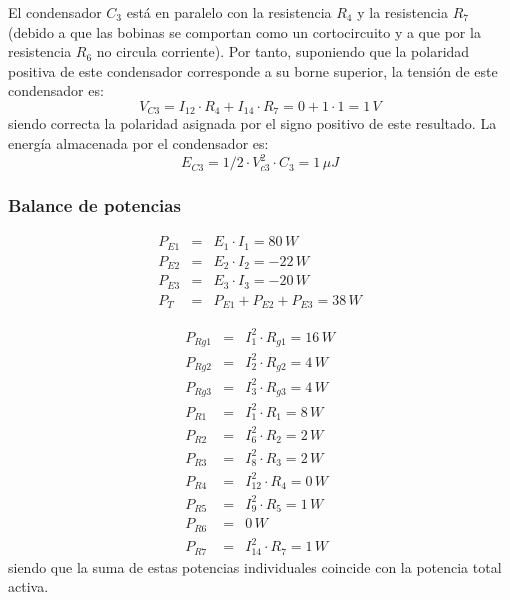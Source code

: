 \documentclass[10pt]{article}
\begin{document}
El condensador $C_{3}$ está en paralelo con la resistencia $R_{4}$
y la resistencia $R_{7}$ (debido a que las bobinas se comportan como
un cortocircuito y a que por la resistencia $R_{6}$ no circula corriente).
Por tanto, suponiendo que la polaridad positiva de este condensador
corresponde a su borne superior, la tensión de este condensador es:
\[
V_{C3}=I_{12}\cdot R_{4}+I_{14}\cdot R_{7}=0+1\cdot1=1\, V
\]
siendo correcta la polaridad asignada por el signo positivo de este
resultado. La energía almacenada por el condensador es:
\[
E_{C3}=1/2\cdot V_{c3}^{2}\cdot C_{3}=1\,\mu J
\]



\subsubsection*{Balance de potencias}


\begin{eqnarray*}
P_{E1} & = & E_{1}\cdot I_{1}=80\, W\\
P_{E2} & = & E_{2}\cdot I_{2}=-22\, W\\
P_{E3} & = & E_{3}\cdot I_{3}=-20\, W\\
P_{T} & = & P_{E1}+P_{E2}+P_{E3}=38\, W
\end{eqnarray*}


\begin{eqnarray*}
P_{Rg1} & = & I_{1}^{2}\cdot R_{g1}=16\, W\\
P_{Rg2} & = & I_{2}^{2}\cdot R_{g2}=4\, W\\
P_{Rg3} & = & I_{3}^{2}\cdot R_{g3}=4\, W\\
P_{R1} & = & I_{1}^{2}\cdot R_{1}=8\, W\\
P_{R2} & = & I_{6}^{2}\cdot R_{2}=2\, W\\
P_{R3} & = & I_{8}^{2}\cdot R_{3}=2\, W\\
P_{R4} & = & I_{12}^{2}\cdot R_{4}=0\, W\\
P_{R5} & = & I_{9}^{2}\cdot R_{5}=1\, W\\
P_{R6} & = & 0\, W\\
P_{R7} & = & I_{14}^{2}\cdot R_{7}=1\, W
\end{eqnarray*}
siendo que la suma de estas potencias individuales coincide con la
potencia total activa.
\end{document}

